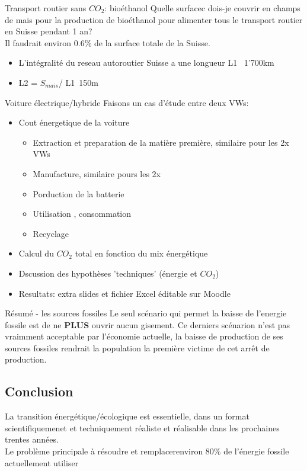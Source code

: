 \begin{parag}{Transport routier sans $CO_2$: bioéthanol}
	Quelle surfacec dois-je couvrir en champs de mais pour la production de bioéthanol pour alimenter tous le transport routier en Suisse pendant 1 an?\\
	Il faudrait environ 0.6\% de la surface totale de la Suisse.
	\begin{itemize}
		\item L'intégralité du reseau autoroutier Suisse a une longueur L1 ~1'700km
		\item L2 = $S_{mais}$/ L1~150m
	\end{itemize}
\end{parag}
\begin{parag}{Voiture électrique/hybride}
	Faisons un cas d'étude entre deux VWs:
    \begin{itemize}
	    \item Cout énergetique de la voiture
		    \begin{itemize}
			    \item Extraction et preparation de la matière première, similaire pour les 2x VWs
			    \item Manufacture, similaire pours les 2x
			    \item Porduction de la batterie
			    \item Utilisation , consommation
			    \item Recyclage
		    \end{itemize}
		    
		    \item Calcul du $CO_2$ total en fonction du mix énergétique
		    \item Dscussion des hypothèses 'techniques' (énergie et $CO_2$)
		    \item Resultats: extra slides et fichier Excel éditable sur Moodle
    \end{itemize}
    
\end{parag}

	
\begin{parag}{Résumé - les sources fossiles}
Le seul scénario qui permet la baisse de l'energie fossile est de ne \textbf{PLUS} ouvrir aucun gisement. Ce derniers scénarion n'est pas vraimment acceptable par l'économie actuelle, la baisse de production de ses sources fossiles rendrait la population la première victime de cet arrêt de production.
\end{parag}
\subsection{Conclusion}
    La transition énergétique/écologique est essentielle, dans un format scientifiquemenet et techniquement réaliste et réalisable dans les prochaines trentes années.\\
    Le problème principale à résoudre et remplacerenviron 80\% de l'énergie fossile actuellement utiliser


